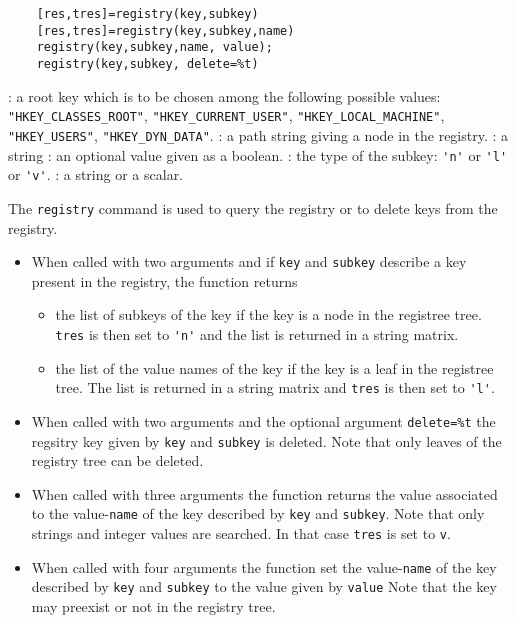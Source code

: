 \begin{mandesc}
\end{mandesc}
\begin{calling_sequence}
  \begin{verbatim}
    [res,tres]=registry(key,subkey) 
    [res,tres]=registry(key,subkey,name) 
    registry(key,subkey,name, value);
    registry(key,subkey, delete=%t)
  \end{verbatim}
\end{calling_sequence}
\begin{parameters}
  \begin{varlist}
    : a root key which is to be chosen among the following 
    possible values: \verb!"HKEY_CLASSES_ROOT"!, 
    \verb!"HKEY_CURRENT_USER"!, \verb!"HKEY_LOCAL_MACHINE"!, 
    \verb!"HKEY_USERS"!, \verb!"HKEY_DYN_DATA"!. 
    : a path string giving a node in the registry. 
    : a string 
    : an optional value given as a boolean. 
    : the type of the subkey: \verb!'n'! or \verb!'l'! or \verb!'v'!.
    : a string or a scalar. 
  \end{varlist}
\end{parameters}
\begin{mandescription}
  The \verb!registry! command is used to query the registry or to delete keys 
  from the registry. 
  \begin{itemize}
  \item  When called with two arguments and if \verb!key! and \verb!subkey! describe a key present in the registry, the function returns 
    \begin{itemize}
    \item the list of subkeys of the key if the key is a node in the 
      registree tree.  \verb!tres! is then set to  \verb!'n'! and the 
      list is returned in a string matrix. 
    \item the list of the value names of the key if the key is a leaf 
      in the registree tree. The list is returned in a string matrix and 
      \verb!tres! is then set to  \verb!'l'!. 
    \end{itemize}
  \item When called with two arguments and the optional argument 
    \verb!delete=%t! the regsitry key given by  \verb!key! and \verb!subkey!
    is deleted. Note that only leaves of the registry tree can be deleted. 
  \item   When called with three arguments the function returns the value 
    associated to the value-\verb!name! of the key  described by 
    \verb!key! and \verb!subkey!. Note that only strings and integer 
    values are searched. In that case \verb!tres! is set to \verb!v!.
  \item When called with four arguments the function set the
    value-\verb!name! of the key  described by 
    \verb!key! and \verb!subkey! to the value given by \verb!value! 
    Note that the key may preexist or not in the registry tree.
  \end{itemize}
\end{mandescription}

